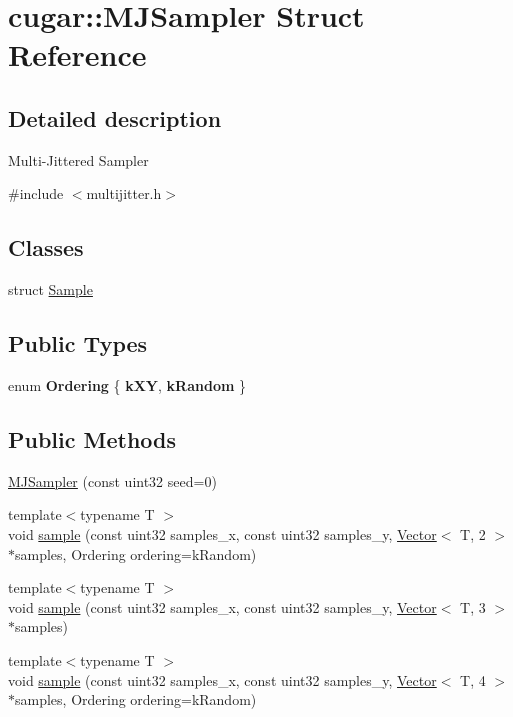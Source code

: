 \hypertarget{structcugar_1_1_m_j_sampler}{}\section{cugar\+:\+:M\+J\+Sampler Struct Reference}
\label{structcugar_1_1_m_j_sampler}


\subsection{Detailed description}
Multi-\/\+Jittered Sampler 

{\ttfamily \#include $<$multijitter.\+h$>$}

\subsection*{Classes}
\begin{DoxyCompactItemize}
\item 
struct \hyperlink{structcugar_1_1_m_j_sampler_1_1_sample}{Sample}
\end{DoxyCompactItemize}
\subsection*{Public Types}
\begin{DoxyCompactItemize}
\item 
\mbox{\label{structcugar_1_1_m_j_sampler_ae5759523640dc8f431f1a5cc04e64c9e}} 
enum {\bfseries Ordering} \{ {\bfseries k\+XY}, 
{\bfseries k\+Random}
 \}
\end{DoxyCompactItemize}
\subsection*{Public Methods}
\begin{DoxyCompactItemize}
\item 
\hyperlink{structcugar_1_1_m_j_sampler_a8863e570f5124b717e6c15743f231921}{M\+J\+Sampler} (const uint32 seed=0)
\item 
{\footnotesize template$<$typename T $>$ }\\void \hyperlink{structcugar_1_1_m_j_sampler_a4f7493268a06f465bd0d25bba662e3eb}{sample} (const uint32 samples\+\_\+x, const uint32 samples\+\_\+y, \hyperlink{structcugar_1_1_vector}{Vector}$<$ T, 2 $>$ $\ast$samples, Ordering ordering=k\+Random)
\item 
{\footnotesize template$<$typename T $>$ }\\void \hyperlink{structcugar_1_1_m_j_sampler_acada4f8e1f19e41b41700c831d09d3d2}{sample} (const uint32 samples\+\_\+x, const uint32 samples\+\_\+y, \hyperlink{structcugar_1_1_vector}{Vector}$<$ T, 3 $>$ $\ast$samples)
\item 
{\footnotesize template$<$typename T $>$ }\\void \hyperlink{structcugar_1_1_m_j_sampler_a0794bef05d321470e0733fe5e3b66266}{sample} (const uint32 samples\+\_\+x, const uint32 samples\+\_\+y, \hyperlink{structcugar_1_1_vector}{Vector}$<$ T, 4 $>$ $\ast$samples, Ordering ordering=k\+Random)
\end{DoxyCompactItemize}
